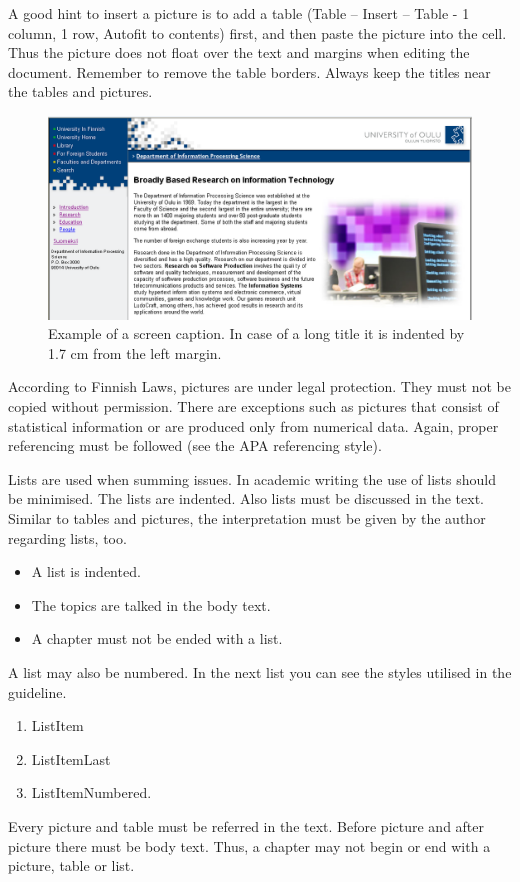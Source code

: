 \documentclass[a4paper,12pt]{article}
\begin{document}
A good hint to insert a picture is to add a table (Table – Insert – Table - 1 column, 1 row, Autofit to contents) first, and then paste the picture into the cell. Thus the picture does not float over the text and margins when editing the document. Remember to remove the table borders. Always keep the titles near the tables and pictures. 
\begin{figure}[h]
    \centering
    \includegraphics[scale=0.5]{img/example1.png}
    \caption{Example of a screen caption. In case of a long title it is indented by 1.7 cm from the left margin.}
    \label{fig:figure1}
\end{figure}

According to Finnish Laws, pictures are under legal protection. They must not be copied without permission. There are exceptions such as pictures that consist of statistical information or are produced only from numerical data. Again, proper referencing must be followed (see the APA referencing style).

Lists are used when summing issues. In academic writing the use of lists should be minimised. The lists are indented. Also lists must be discussed in the text. Similar to tables and pictures, the interpretation must be given by the author regarding lists, too.

\begin{itemize}
    \item A list is indented.
    \item The topics are talked in the body text.
    \item A chapter must not be ended with a list.
\end{itemize}

A list may also be numbered. In the next list you can see the styles utilised in the guideline. 
\begin{enumerate}
    \item ListItem
    \item ListItemLast
    \item ListItemNumbered.
\end{enumerate}
Every picture and table must be referred in the text. Before picture and after picture there must be body text. Thus, a chapter may not begin or end with a picture, table or list. 
\end{document}
